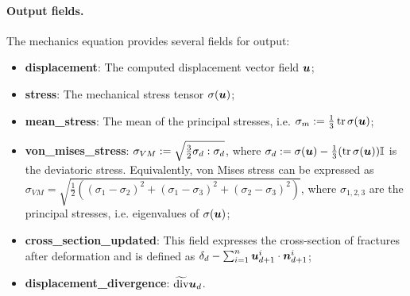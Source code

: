 \paragraph{Output fields.}
The mechanics equation provides several fields for output:
\begin{itemize}
    \item \textbf{displacement}: The computed displacement vector field $\mathbf{\boldsymbol{u}}$;
    \item \textbf{stress}: The mechanical stress tensor ${\mathbb{\sigma}}(\mathbf{\boldsymbol{u}})$;
    \item \textbf{mean\_stress}: The mean of the principal stresses, i.e. $\sigma_m:=\frac13\operatorname{tr}{\mathbb{\sigma}}(\mathbf{\boldsymbol{u}})$;
    \item \textbf{von\_mises\_stress}: $\sigma_{VM}:=\sqrt{\frac32{\mathbb{\sigma}}_d:{\mathbb{\sigma}}_d}$, where ${\mathbb{\sigma}}_d:={\mathbb{\sigma}}(\mathbf{\boldsymbol{u}})-\frac13(\operatorname{tr}{\mathbb{\sigma}}(\mathbf{\boldsymbol{u}})){\mathbb{I}}$ is the deviatoric stress.
    Equivalently, von Mises stress can be expressed as $\sigma_{VM} = \sqrt{\frac12\left((\sigma_1-\sigma_2)^2+(\sigma_1-\sigma_3)^2+(\sigma_2-\sigma_3)^2\right)}$, where $\sigma_{1,2,3}$ are the principal stresses, i.e. eigenvalues of ${\mathbb{\sigma}}(\mathbf{\boldsymbol{u}})$;
    \item \textbf{cross\_section\_updated}: This field expresses the cross-section of fractures after deformation and is defined as $\delta_d-\sum_{i=1}^n\mathbf{\boldsymbol{u}}^i_{d+1}\cdot\mathbf{\boldsymbol{n}}^i_{d+1}$;
    \item \textbf{displacement\_divergence}: $\widetilde{\operatorname{div}}\mathbf{\boldsymbol{u}}_d$.
\end{itemize}


